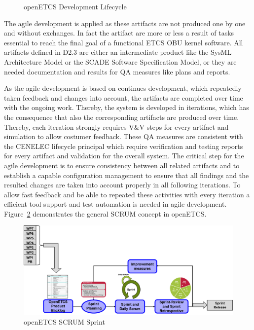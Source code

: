 \begin{figure}[hbt]
  \centering
  \def\svgwidth{.9\textwidth}
  {\tiny
  }
  \caption{openETCS Development Lifecycle}
  \label{fig:lifecycle2}
\end{figure}


The agile development is applied as these artifacts are not produced one by one and without exchanges. In fact the artifact are more or less a result of tasks essential to reach the final goal of a functional ETCS OBU kernel software. All artifacts defined in D2.3 are either an intermediate product like the SysML Architecture Model or the SCADE Software Specification Model, or they are needed documentation and results for QA measures like plans and reports.

As the agile development is based on continues development, which repeatedly taken feedback and changes into account, the artifacts are completed over time with the ongoing work. Thereby, the system is developed in iterations, which has the consequence that also the corresponding artifacts are produced over time. Thereby, each iteration strongly requires V\&V steps for every artifact and simulation to allow costumer feedback. These QA measures are consistent with the CENELEC lifecycle principal which require verification and testing reports for every artifact and validation for the overall system. The critical step for the agile development is to ensure consistency between all related artifacts and to establish a capable configuration management to ensure that all findings and the resulted changes are taken into account properly in all following iterations. To allow fast feedback and be able to repeated these activities with every iteration a efficient tool support and test automation is needed in agile development. Figure~\ref{fig:openETCSSCRUMSprint} demonstrates the general SCRUM concept in openETCS.

\begin{figure}[hbt]
\centering
\includegraphics[width=0.95\linewidth]{./images/openETCSoverallScrum}
\caption{openETCS SCRUM Sprint}
\label{fig:openETCSSCRUMSprint}
\end{figure}

